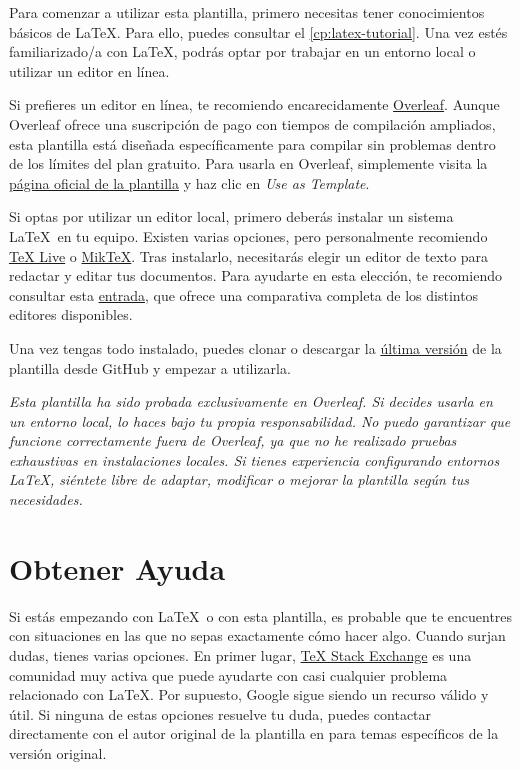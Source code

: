 Para comenzar a utilizar esta plantilla, primero necesitas tener conocimientos básicos de \LaTeX. Para ello, puedes consultar el \autoref{cp:latex-tutorial}. Una vez estés familiarizado/a con \LaTeX, podrás optar por trabajar en un entorno local o utilizar un editor en línea.

Si prefieres un editor en línea, te recomiendo encarecidamente \href{https://www.overleaf.com/}{Overleaf}. Aunque Overleaf ofrece una suscripción de pago con tiempos de compilación ampliados, esta plantilla está diseñada específicamente para compilar sin problemas dentro de los límites del plan gratuito. Para usarla en Overleaf, simplemente visita la \href{https://www.overleaf.com/latex/templates/unofficial-polytechnic-university-of-leiria-estg-thesis-slash-report-template/tqgbrncfhwgt}{página oficial de la plantilla} y haz clic en \textit{Use as Template}.

Si optas por utilizar un editor local, primero deberás instalar un sistema \LaTeX~en tu equipo. Existen varias opciones, pero personalmente recomiendo \href{https://www.tug.org/texlive/}{TeX Live} o \href{https://miktex.org/}{MikTeX}. Tras instalarlo, necesitarás elegir un editor de texto para redactar y editar tus documentos. Para ayudarte en esta elección, te recomiendo consultar esta \href{https://tex.stackexchange.com/questions/339/latex-editors-ides}{entrada}, que ofrece una comparativa completa de los distintos editores disponibles.

Una vez tengas todo instalado, puedes clonar o descargar la \href{https://github.com/enriiquee/umu-thesis}{última versión} de la plantilla desde GitHub y empezar a utilizarla.

\begin{block}[warning]
\textit{Esta plantilla ha sido probada exclusivamente en Overleaf. Si decides usarla en un entorno local, lo haces bajo tu propia responsabilidad. No puedo garantizar que funcione correctamente fuera de Overleaf, ya que no he realizado pruebas exhaustivas en instalaciones locales. Si tienes experiencia configurando entornos \LaTeX, siéntete libre de adaptar, modificar o mejorar la plantilla según tus necesidades.}
\end{block}

\section{Obtener Ayuda}

Si estás empezando con \LaTeX~o con esta plantilla, es probable que te encuentres con situaciones en las que no sepas exactamente cómo hacer algo. Cuando surjan dudas, tienes varias opciones. En primer lugar, \href{https://tex.stackexchange.com/}{TeX Stack Exchange} es una comunidad muy activa que puede ayudarte con casi cualquier problema relacionado con \LaTeX. Por supuesto, Google sigue siendo un recurso válido y útil. Si ninguna de estas opciones resuelve tu duda, puedes contactar directamente con el autor original de la plantilla en \textit{\textcolor{blue}{}} para temas específicos de la versión original.

